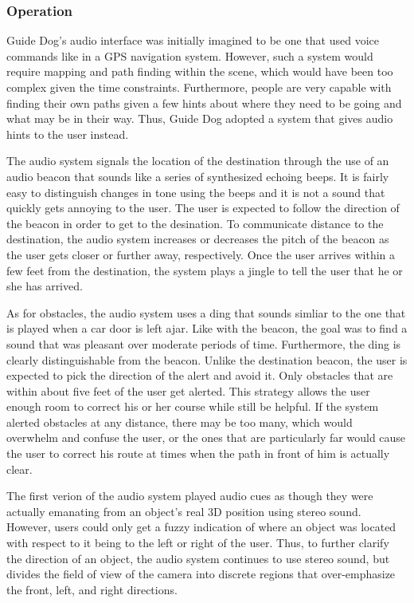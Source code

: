 \subsubsection{Operation}
\label{sec:audio-op}

Guide Dog's audio interface was initially imagined to be one that used voice 
commands like in a GPS navigation system. However, such a system would require
mapping and path finding within the scene, which would have been too complex
given the time constraints. Furthermore, people are very capable with finding
their own paths given a few hints about where they need to be going and what
may be in their way. Thus, Guide Dog adopted a system that gives audio hints to
the user instead.

The audio system signals the location of the destination through the use of an
audio beacon that sounds like a series of synthesized echoing beeps. It is fairly
easy to distinguish changes in tone using the beeps and it is not a sound that
quickly gets annoying to the user. The user is expected to follow the direction
of the beacon in order to get to the desination. To communicate distance to the 
destination, the audio system increases or decreases the pitch of the beacon as 
the user gets closer or further away, respectively. Once the user arrives within
a few feet from the destination, the system plays a jingle to tell the user that 
he or she has arrived. 

As for obstacles, the audio system uses a ding that sounds simliar 
to the one that is played when a car door is left ajar. Like with the beacon, 
the goal was to find a sound that was pleasant over moderate periods of time. 
Furthermore, the ding is clearly distinguishable from the beacon. Unlike the
destination beacon, the user is expected to pick the direction of the alert and
avoid it. Only obstacles that are within about five feet of the user get alerted.
This strategy allows the user enough room to correct his or her course while 
still be helpful. If the system alerted obstacles at any distance, there may be 
too many, which would overwhelm and confuse the user, or the ones that are 
particularly far would cause the user to correct his route at times when the 
path in front of him is actually clear.

The first verion of the audio system played audio cues as though they were 
actually emanating from an object's real 3D position using stereo sound. However,
users could only get a fuzzy indication of where an object was located with 
respect to it being to the left or right of the user. Thus, to further clarify 
the direction of an object, the audio system continues to use stereo sound, but
divides the field of view of the camera into discrete regions that over-emphasize 
the front, left, and right directions. 

